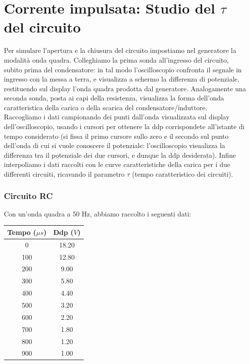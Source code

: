 \section{Corrente impulsata: Studio del $\tau$ del circuito}

Per simulare l'apertura e la chiusura del circuito impostiamo nel generatore la modalità onda quadra. Colleghiamo la prima sonda all'ingresso del circuito, subito prima del condensatore: in tal modo l'oscilloscopio confronta il segnale in ingresso con la messa a terra, e visualizza a schermo la differenza di potenziale, restituendo sul display l'onda quadra prodotta dal generatore.  
Analogamente una seconda sonda, posta ai capi della resistenza, visualizza la forma dell'onda caratteristica della carica o della scarica del condensatore/induttore. \\
Raccogliamo i dati campionando dei punti dall'onda visualizzata sul display dell'oscilloscopio, usando i cursori per ottenere la ddp corrispondete all'istante di tempo considerato (si fissa il primo cursore sullo zero e il secondo sul punto dell'onda di cui si vuole conoscere il potenziale: l'oscilloscopio visualizza la differenza tra il potenziale dei due cursori, e dunque la ddp desiderata).
Infine interpoliamo i dati raccolti con le curve caratteristiche della carica per i due differenti circuiti, ricavando il parametro $\tau$ (tempo caratteristico dei circuiti).

\subsubsection{Circuito RC}
Con un'onda quadra a 50 Hz, abbiamo raccolto i seguenti dati:

\begin{center}
\begin{tabular}{*{2}{c}}
Tempo ($\mu s$) & Ddp ($V$) \\
\midrule
0 & 18.20 \\
100 & 12.80 \\
200 & 9.00 \\
300 & 5.80 \\
400 & 4.40 \\
500 & 3.20 \\
600 & 2.20 \\
700 & 1.80 \\
800 & 1.20 \\
900 & 1.00 \\
\end{tabular}
\end{center}

